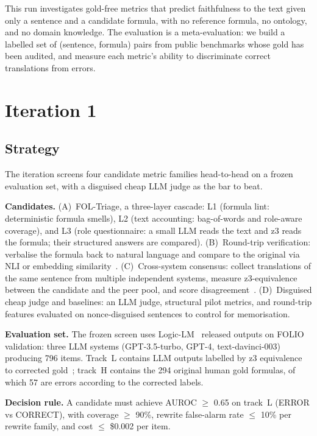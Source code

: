 \documentclass[11pt,letterpaper]{article}
\begin{document}
This run investigates gold-free metrics that predict faithfulness to the text given only a sentence and a candidate formula, with no reference formula, no ontology, and no domain knowledge. The evaluation is a meta-evaluation: we build a labelled set of (sentence, formula) pairs from public benchmarks whose gold has been audited, and measure each metric's ability to discriminate correct translations from errors.

\section{Iteration 1}

\subsection{Strategy}

The iteration screens four candidate metric families head-to-head on a frozen evaluation set, with a disguised cheap LLM judge as the bar to beat.

\textbf{Candidates.} (A)~FOL-Triage, a three-layer cascade: L1 (formula lint: deterministic formula smells), L2 (text accounting: bag-of-words and role-aware coverage), and L3 (role questionnaire: a small LLM reads the text and z3 reads the formula; their structured answers are compared). (B)~Round-trip verification: verbalise the formula back to natural language and compare to the original via NLI or embedding similarity~\citep{Amrollahi2026}. (C)~Cross-system consensus: collect translations of the same sentence from multiple independent systems, measure z3-equivalence between the candidate and the peer pool, and score disagreement~\citep{Li2024}. (D)~Disguised cheap judge and baselines: an LLM judge, structural pilot metrics, and round-trip features evaluated on nonce-disguised sentences to control for memorisation.

\textbf{Evaluation set.} The frozen screen uses Logic-LM~\citep{Pan2023} released outputs on FOLIO validation: three LLM systems (GPT-3.5-turbo, GPT-4, text-davinci-003) producing 796 items. Track~L contains LLM outputs labelled by z3 equivalence to corrected gold~\citep{Brunello2025}; track~H contains the 294 original human gold formulas, of which 57 are errors according to the corrected labels.

\textbf{Decision rule.} A candidate must achieve AUROC $\geq$ 0.65 on track~L (ERROR vs CORRECT), with coverage $\geq$ 90\%, rewrite false-alarm rate $\leq$ 10\% per rewrite family, and cost $\leq$ \$0.002 per item.
\end{document}
